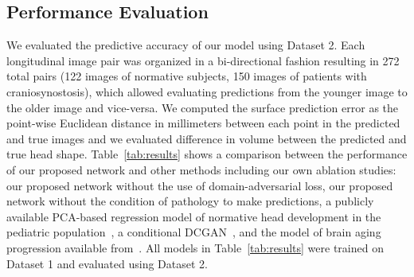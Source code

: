 \documentclass[conference]{IEEEtran}
\begin{document}
\subsection{Performance Evaluation}
We evaluated the predictive accuracy of our model using Dataset 2. Each longitudinal image pair was organized in a bi-directional fashion resulting in 272 total pairs (122 images of normative subjects, 150 images of patients with craniosynostosis), which allowed evaluating predictions from the younger image to the older image and vice-versa. We computed the surface prediction error as the point-wise Euclidean distance in millimeters between each point in the predicted and true images and we evaluated difference in volume between the predicted and true head shape. Table~\ref{tab:results} shows a comparison between the performance of our proposed network and other methods including our own ablation studies: our proposed network without the use of domain-adversarial loss, our proposed network without the condition of pathology to make predictions, a publicly available PCA-based regression model of normative head development in the pediatric population~\cite{Liu2022Data-driven}, a conditional DCGAN~\cite{Radford2016Unsupervised}, and the model of brain aging progression available from~\cite{Xia2021Learning}. All models in Table~\ref{tab:results} were trained on Dataset 1 and evaluated using Dataset 2.
\begin{table}[h]
    \centering
\caption{\label{tab:results}Mean surface prediction and volumetric errors for patients in Dataset 2. P-values estimated using a paired Wilcoxon signed-rank test between the proposed network and other methods.}
\end{table}
\end{document}
